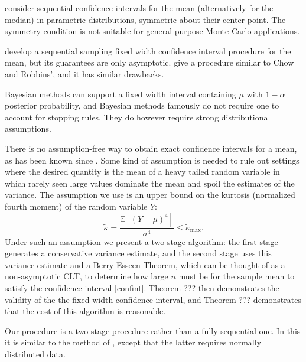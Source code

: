 \documentclass[graybox]{svmult}
\newcommand\e{\mathbb{E}}
\newcommand{\tkappa}{\tilde{\kappa}}
\begin{document}
\cite{SerfWack1976} consider sequential confidence intervals for the mean (alternatively for the median) in parametric distributions, symmetric about their center point.  The symmetry condition is not suitable for general
purpose Monte Carlo applications.

\cite{ChoRob65a} develop a sequential sampling fixed width confidence interval procedure for the mean, but its guarantees are only asymptotic. \cite{MukhDatt1996} give a procedure similar to Chow and Robbins', and it has similar drawbacks.

Bayesian methods can support a fixed width
interval containing $\mu$ with $1-\alpha$ posterior probability, and
Bayesian methods famously do not require one to account
for stopping rules. They do however require strong distributional assumptions.

There is no assumption-free way to obtain exact confidence intervals for a mean,
as has been known since \cite[Corollary 2]{BahSav56}. Some kind of assumption is needed to rule out settings where the desired quantity is the
mean of a heavy tailed random variable in which
rarely seen large values dominate the mean and spoil the estimates of the variance.
The assumption we use is an upper bound on
the kurtosis (normalized fourth moment) of the
random variable $Y$:
\begin{equation} \label{kurtassump}
\tkappa = \frac{\e[(Y-\mu)^4]}{\sigma^4} \le \tkappa_{\max}.
\end{equation}
Under such an assumption we present
a two stage algorithm: the first stage generates
a conservative variance estimate, and the second stage
uses this variance estimate and a Berry-Esseen Theorem, which can be thought of as a non-asymptotic CLT, to determine how large $n$ must be for the sample mean to satisfy the confidence interval \eqref{confint}.  Theorem ??? then demonstrates the validity of the the fixed-width confidence interval, and Theorem ??? demonstrates that the cost of this algorithm is reasonable.

Our procedure is a two-stage procedure
rather than a fully sequential one.  In
this it is similar to the method of
\cite{stei:1945,stei:1949}, except that
the latter requires normally distributed
data.
\end{document}

